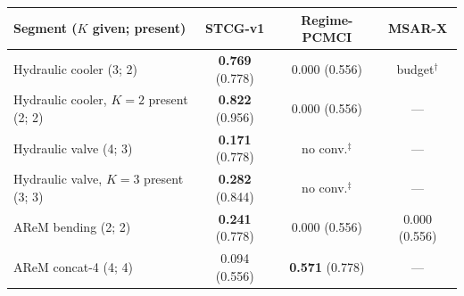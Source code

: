 \begin{tabular}{lccc}
\toprule
Segment ($K$ given; present) & STCG-v1 & Regime-PCMCI & MSAR-X \\
\midrule
Hydraulic cooler (3; 2) & \textbf{0.769} (0.778) & 0.000 (0.556) & budget$^{\dagger}$ \\
Hydraulic cooler, $K{=}2$ present (2; 2) & \textbf{0.822} (0.956) & 0.000 (0.556) & --- \\
Hydraulic valve (4; 3) & \textbf{0.171} (0.778) & no conv.$^{\ddagger}$ & --- \\
Hydraulic valve, $K{=}3$ present (3; 3) & \textbf{0.282} (0.844) & no conv.$^{\ddagger}$ & --- \\
AReM bending (2; 2) & \textbf{0.241} (0.778) & 0.000 (0.556) & 0.000 (0.556) \\
AReM concat-4 (4; 4) & 0.094 (0.556) & \textbf{0.571} (0.778) & --- \\
\bottomrule
\end{tabular}
